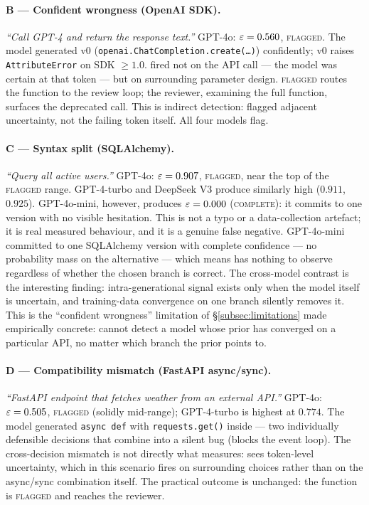 \paragraph{B --- Confident wrongness (OpenAI SDK).}
\textit{``Call GPT-4 and return the response text.''} GPT-4o: $\varepsilon
= 0.560$, \textsc{flagged}. The model generated v0
(\texttt{openai.ChatCompletion.create(\ldots)}) confidently; v0
raises \texttt{AttributeError} on SDK $\ge 1.0$. \eps fired not on
the API call --- the model was certain at that token --- but on
surrounding parameter design. \textsc{flagged} routes the function
to the review loop; the reviewer, examining the full function,
surfaces the deprecated call. This is indirect detection: \eps
flagged adjacent uncertainty, not the failing token itself. All
four models flag.

\paragraph{C --- Syntax split (SQLAlchemy).}
\textit{``Query all active users.''} GPT-4o: $\varepsilon = 0.907$,
\textsc{flagged}, near the top of the \textsc{flagged} range.
GPT-4-turbo and DeepSeek V3 produce similarly high \eps ($0.911$,
$0.925$). GPT-4o-mini, however, produces $\varepsilon = 0.000$
(\textsc{complete}): it commits to one version with no visible
hesitation. This is not a typo or a data-collection artefact; it is
real measured behaviour, and it is a genuine false negative.
GPT-4o-mini committed to one SQLAlchemy version with complete
confidence --- no probability mass on the alternative --- which
means \eps has nothing to observe regardless of whether the chosen
branch is correct. The cross-model contrast is the interesting
finding: intra-generational signal exists only when the model itself
is uncertain, and training-data convergence on one branch silently
removes it. This is the ``confident wrongness'' limitation of
\S\ref{subsec:limitations} made empirically concrete: \eps cannot
detect a model whose prior has converged on a particular API, no
matter which branch the prior points to.

\paragraph{D --- Compatibility mismatch (FastAPI async/sync).}
\textit{``FastAPI endpoint that fetches weather from an external
API.''} GPT-4o: $\varepsilon = 0.505$, \textsc{flagged} (solidly mid-range);
GPT-4-turbo is highest at $0.774$. The model generated
\texttt{async def} with \texttt{requests.get()} inside --- two
individually defensible decisions that combine into a silent bug
(blocks the event loop). The cross-decision mismatch is not
directly what \eps measures: \eps sees token-level uncertainty,
which in this scenario fires on surrounding choices rather than on
the async/sync combination itself. The practical outcome is
unchanged: the function is \textsc{flagged} and reaches the reviewer.

